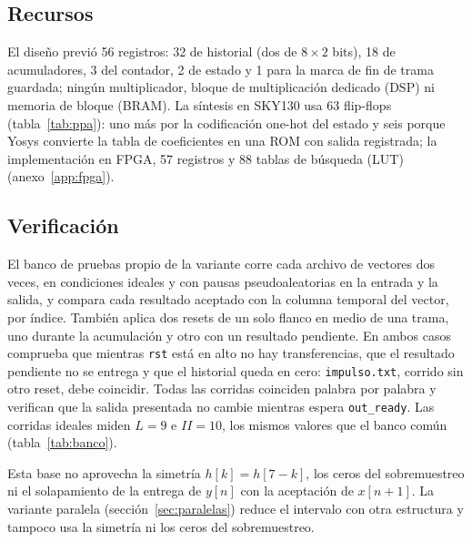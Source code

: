 \subsection{Recursos}

El diseño previó 56 registros: 32 de historial (dos de $8 \times 2$ bits), 18 de acumuladores, 3 del contador, 2 de estado y 1 para la marca de fin de trama guardada; ningún multiplicador, bloque de multiplicación dedicado (DSP) ni memoria de bloque (BRAM). La síntesis en SKY130 usa 63 flip-flops (tabla~\ref{tab:ppa}): uno más por la codificación one-hot del estado y seis porque Yosys convierte la tabla de coeficientes en una ROM con salida registrada; la implementación en FPGA, 57 registros y 88 tablas de búsqueda (LUT) (anexo~\ref{app:fpga}).

\subsection{Verificación}

El banco de pruebas propio de la variante corre cada archivo de vectores dos veces, en condiciones ideales y con pausas pseudoaleatorias en la entrada y la salida, y compara cada resultado aceptado con la columna temporal del vector, por índice. También aplica dos resets de un solo flanco en medio de una trama, uno durante la acumulación y otro con un resultado pendiente. En ambos casos comprueba que mientras \texttt{rst} está en alto no hay transferencias, que el resultado pendiente no se entrega y que el historial queda en cero: \texttt{impulso.txt}, corrido sin otro reset, debe coincidir. Todas las corridas coinciden palabra por palabra y verifican que la salida presentada no cambie mientras espera \texttt{out\_ready}. Las corridas ideales miden $L = 9$ e $II = 10$, los mismos valores que el banco común (tabla~\ref{tab:banco}).

Esta base no aprovecha la simetría $h[k] = h[7-k]$, los ceros del sobremuestreo ni el solapamiento de la entrega de $y[n]$ con la aceptación de $x[n+1]$. La variante paralela (sección~\ref{sec:paralelas}) reduce el intervalo con otra estructura y tampoco usa la simetría ni los ceros del sobremuestreo.
